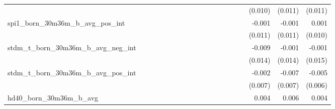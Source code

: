 \begin{tabular}{lrrrrrrrrrrrrrrrrrr}
                                            &              &              &              &              &              &              &              &              &               &              &              &               &              &              &               &      (0.010) &      (0.011) &       (0.011) \\ 
spi1\_born\_30m36m\_b\_avg\_pos\_int        &              &              &              &              &              &              &              &              &               &              &              &               &              &              &               &       -0.001 &       -0.001 &         0.001 \\ 
                                            &              &              &              &              &              &              &              &              &               &              &              &               &              &              &               &      (0.011) &      (0.011) &       (0.010) \\ 
stdm\_t\_born\_30m36m\_b\_avg\_neg\_int     &              &              &              &              &              &              &              &              &               &              &              &               &              &              &               &       -0.009 &       -0.001 &        -0.001 \\ 
                                            &              &              &              &              &              &              &              &              &               &              &              &               &              &              &               &      (0.014) &      (0.014) &       (0.015) \\ 
stdm\_t\_born\_30m36m\_b\_avg\_pos\_int     &              &              &              &              &              &              &              &              &               &              &              &               &              &              &               &       -0.002 &       -0.007 &        -0.005 \\ 
                                            &              &              &              &              &              &              &              &              &               &              &              &               &              &              &               &      (0.007) &      (0.007) &       (0.006) \\ 
hd40\_born\_30m36m\_b\_avg                  &              &              &              &              &              &              &              &              &               &              &              &               &              &              &               &        0.004 &        0.006 &         0.004 \\ 

\end{tabular}
